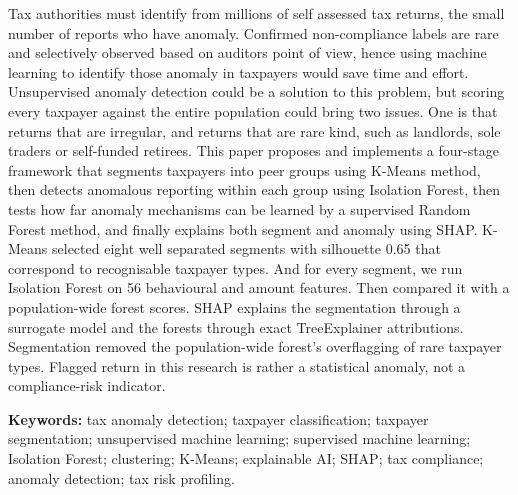 Tax authorities must identify from millions of self assessed tax returns, the small number of reports who have anomaly. Confirmed non-compliance labels are rare and selectively observed based on auditors point of view, hence using machine learning to identify those anomaly in taxpayers would save time and effort. Unsupervised anomaly detection could be a solution to this problem, but scoring every taxpayer against the entire population could bring two issues. One is that returns that are irregular, and returns that are rare kind, such as landlords, sole traders or self-funded retirees. This paper proposes and implements a four-stage framework that segments taxpayers into peer groups using K-Means method, then detects anomalous reporting within each group using Isolation Forest, then tests how far anomaly mechanisms can be learned by a supervised Random Forest method, and finally explains both segment and anomaly using SHAP. K-Means selected eight well separated segments with silhouette 0.65 that correspond to recognisable taxpayer types. And for every segment, we run Isolation Forest on 56 behavioural and amount features. Then compared it with a population-wide forest scores. SHAP explains the segmentation through a surrogate model and the forests through exact TreeExplainer attributions. Segmentation removed the population-wide forest's overflagging of rare taxpayer types. Flagged return in this research is rather a statistical anomaly, not a compliance-risk indicator.

\vspace{0.5em}
\noindent\textbf{Keywords:} tax anomaly detection; taxpayer classification; taxpayer segmentation; unsupervised machine learning; supervised machine learning; Isolation Forest; clustering; K-Means; explainable AI; SHAP; tax compliance; anomaly detection; tax risk profiling.
